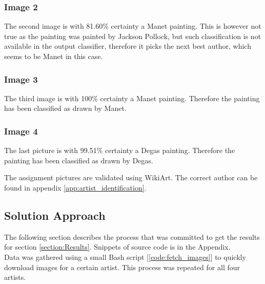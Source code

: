 \subsubsection*{Image 2}

The second image is with 81.60\% certainty a Manet painting. This is however not true as the painting was painted by Jackson Pollock, but such classification is not available in the output classifier, therefore it picks the next best author, which seems to be Manet in this case. 


\subsubsection*{Image 3}

The third image is with 100\% certainty a Manet painting. Therefore the painting has been classified as drawn by Manet.



\subsubsection*{Image 4}

The last picture is with 99.51\% certainty a Degas painting. Therefore the painting has been classified as drawn by Degas.



The assignment pictures are validated using WikiArt. The correct author can be found in appendix  \ref{app:artist_identification}.  

\subsection{Solution Approach}
The following section describes the process that was committed to get the results for section \ref{section:Results}. Snippets of source code is in the Appendix.\\

 Data was gathered using a small Bash script [\ref{code:fetch_images}] to quickly download images for a certain artist. This process was repeated for all four artists.\\

